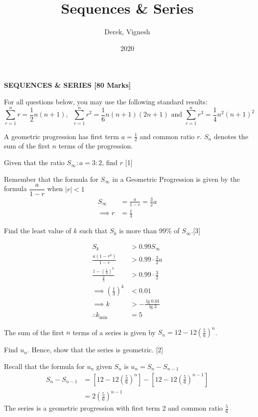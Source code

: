 \documentclass[12pt, a4 paper]{article}
\title{Sequences \& Series}
\author{Derek, Vignesh}
\date{2020}
\begin{document}
\maketitle

\textbf{SEQUENCES \& SERIES [80 Marks]}

For all questions below, you may use the following standard results:
\[
\sum_{r=1}^{n}r = \frac{1}{2}n(n+1),\;\; \sum_{r=1}^{n}r^2=\frac{1}{6}n(n+1)(2n+1) \textrm{ and }\sum_{r=1}^{n}r^3=\frac{1}{4}n^2(n+1)^2
\]
\begin{outline}[enumerate]
 \1 A geometric progression has first term \(a=\frac{1}{2}\) and common ratio \(r\). \(S_{n}\) denotes the sum of the first \(n\) terms of the progression. %

 \2 Given that the ratio \(S_{\infty}:a=3:2\), find \(r\) \hfill[1]
 \begin{answer}
  Remember that the formula for \( S_\infty \) in a Geometric Progression is given by the formula \( \dfrac{a}{1-r} \) when \( |r|<1 \)
  \begin{align*}
   S_\infty   & = \frac{a}{1-r} = \frac{3}{2}a \\
   \implies r & = \frac{1}{3}
  \end{align*}
 \end{answer}

 \2 Find the least value of \(k\) such that \(S_{k}\) is more than 99\% of \(S_{\infty}\).\hfill[3]
 \begin{answer}
  \begin{align*}
   S_k                                   & > 0.99S_\infty              \\
   \frac{a(1-r^k)}{1-r}                  & > 0.99 \cdot \frac{3}{2}a   \\
   \frac{1-{\left(\frac{1}{3}\right)}^k}{\frac{2}{3}} & > 0.99 \cdot \frac{3}{2}    \\
   \implies {\left(\frac{1}{3}\right)}^k              & < 0.01                      \\
   \implies k                            & > -\frac{\lg{0.01}}{\lg{3}} \\
   \therefore k_{\min}                   & = 5
  \end{align*}
 \end{answer}

 \1 The sum of the first \(n\) terms of a series is given by \(S_{n}=12-12{\left(\frac{5}{6}\right)}^{n}\). %

 \2 Find \(u_{n}\). Hence, show that the series is geometric. \hfill[2]
 \begin{answer}
  Recall that the formula for \(u_n\) given \(S_n\) is \(u_n = S_n - S_{n-1} \)
  \begin{align*}
   S_n - S_{n-1} & = \left[12-12{\left(\frac{5}{6}\right)}^{n}\right] - \left[12-12{\left(\frac{5}{6}\right)}^{n-1}\right] \\
                 & = 2{\left(\frac{5}{6}\right)}^{n-1}
  \end{align*}
  The series is a geometric progression with first term 2 and common ratio \(\frac{5}{6}\)
 \end{answer}


\end{outline}
\end{document}

